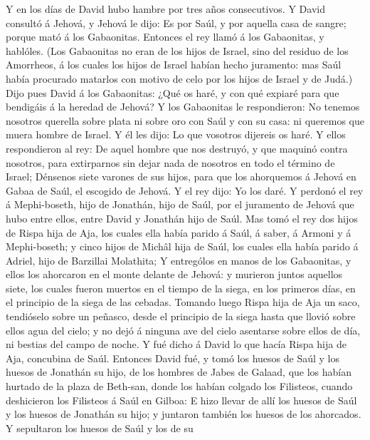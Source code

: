  Y en los días de David hubo hambre por tres años
consecutivos. Y David consultó á Jehová, y Jehová le dijo: Es por Saúl,
y por aquella casa de sangre; porque mató á los Gabaonitas. 
Entonces el rey llamó á los Gabaonitas, y hablóles. (Los Gabaonitas no
eran de los hijos de Israel, sino del residuo de los Amorrheos, á los
cuales los hijos de Israel habían hecho juramento: mas Saúl había
procurado matarlos con motivo de celo por los hijos de Israel y de
Judá.)  Dijo pues David á los Gabaonitas: ¿Qué os haré, y
con qué expiaré para que bendigáis á la heredad de Jehová? 
Y los Gabaonitas le respondieron: No tenemos nosotros querella sobre
plata ni sobre oro con Saúl y con su casa: ni queremos que muera hombre
de Israel. Y él les dijo: Lo que vosotros dijereis os haré. 
Y ellos respondieron al rey: De aquel hombre que nos destruyó, y que
maquinó contra nosotros, para extirparnos sin dejar nada de nosotros en
todo el término de Israel;  Dénsenos siete varones de sus
hijos, para que los ahorquemos á Jehová en Gabaa de Saúl, el escogido de
Jehová. Y el rey dijo: Yo los daré.  Y perdonó el rey á
Mephi-boseth, hijo de Jonathán, hijo de Saúl, por el juramento de Jehová
que hubo entre ellos, entre David y Jonathán hijo de Saúl. 
Mas tomó el rey dos hijos de Rispa hija de Aja, los cuales ella había
parido á Saúl, á saber, á Armoni y á Mephi-boseth; y cinco hijos de
Michâl hija de Saúl, los cuales ella había parido á Adriel, hijo de
Barzillai Molathita;  Y entrególos en manos de los
Gabaonitas, y ellos los ahorcaron en el monte delante de Jehová: y
murieron juntos aquellos siete, los cuales fueron muertos en el tiempo
de la siega, en los primeros días, en el principio de la siega de las
cebadas.  Tomando luego Rispa hija de Aja un saco,
tendióselo sobre un peñasco, desde el principio de la siega hasta que
llovió sobre ellos agua del cielo; y no dejó á ninguna ave del cielo
asentarse sobre ellos de día, ni bestias del campo de noche.
 Y fué dicho á David lo que hacía Rispa hija de Aja,
concubina de Saúl.  Entonces David fué, y tomó los huesos
de Saúl y los huesos de Jonathán su hijo, de los hombres de Jabes de
Galaad, que los habían hurtado de la plaza de Beth-san, donde los habían
colgado los Filisteos, cuando deshicieron los Filisteos á Saúl en
Gilboa:  E hizo llevar de allí los huesos de Saúl y los
huesos de Jonathán su hijo; y juntaron también los huesos de los
ahorcados.  Y sepultaron los huesos de Saúl y los de su
